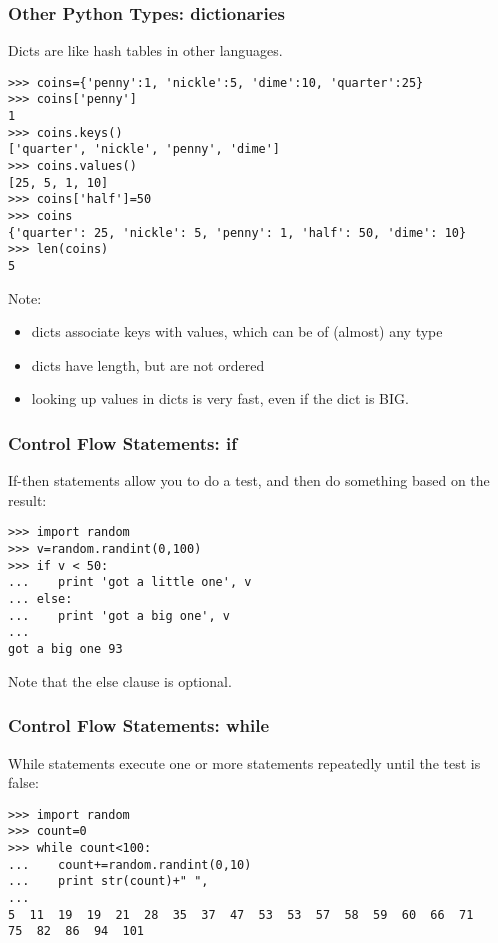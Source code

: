 \documentclass[10pt]{beamer}
\begin{document}
\begin{frame}[fragile]
\frametitle{Other Python Types: dictionaries}

Dicts are like hash tables in other languages.  
\begin{verbatim}
>>> coins={'penny':1, 'nickle':5, 'dime':10, 'quarter':25}
>>> coins['penny']
1
>>> coins.keys()
['quarter', 'nickle', 'penny', 'dime']
>>> coins.values()
[25, 5, 1, 10]
>>> coins['half']=50
>>> coins
{'quarter': 25, 'nickle': 5, 'penny': 1, 'half': 50, 'dime': 10}
>>> len(coins)
5
\end{verbatim}

Note:
\begin{itemize}
\item dicts associate keys with values, which can be of (almost) any type 
\item dicts have length, but are not ordered
\item looking up values in dicts is very fast, even if the dict is BIG.
\end{itemize}

\end{frame}

\begin{frame}[fragile]
\frametitle{Control Flow Statements: if}

If-then statements allow you to do a test, and then do something
based on the result:

\begin{verbatim}
>>> import random
>>> v=random.randint(0,100)
>>> if v < 50:
...    print 'got a little one', v
... else:
...    print 'got a big one', v
... 
got a big one 93
\end{verbatim}

Note that the else clause is optional.

\end{frame}

\begin{frame}[fragile]
\frametitle{Control Flow Statements: while}

While statements execute one or more statements repeatedly until the 
test is false:

\begin{verbatim}
>>> import random
>>> count=0
>>> while count<100:
...    count+=random.randint(0,10)
...    print str(count)+" ",
... 
5  11  19  19  21  28  35  37  47  53  53  57  58  59  60  66  71  
75  82  86  94  101 
\end{verbatim}

\end{frame}
\end{document}
